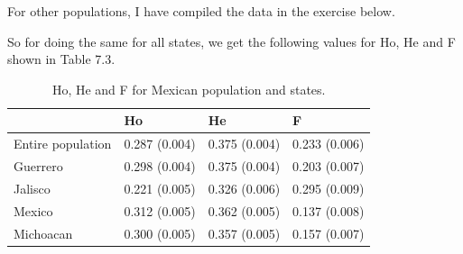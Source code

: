 \documentclass[
]{book}
\newenvironment{Shaded}{\begin{snugshade}}{\end{snugshade}}
\newcommand{\AttributeTok}[1]{\textcolor[rgb]{0.77,0.63,0.00}{#1}}
\newcommand{\ConstantTok}[1]{\textcolor[rgb]{0.00,0.00,0.00}{#1}}
\newcommand{\DecValTok}[1]{\textcolor[rgb]{0.00,0.00,0.81}{#1}}
\newcommand{\FunctionTok}[1]{\textcolor[rgb]{0.00,0.00,0.00}{#1}}
\newcommand{\NormalTok}[1]{#1}
\newcommand{\OtherTok}[1]{\textcolor[rgb]{0.56,0.35,0.01}{#1}}
\newcommand{\SpecialCharTok}[1]{\textcolor[rgb]{0.00,0.00,0.00}{#1}}
\newcommand{\StringTok}[1]{\textcolor[rgb]{0.31,0.60,0.02}{#1}}
\begin{document}
\begin{Shaded}
\end{Shaded}

For other populations, I have compiled the data in the exercise below.

So for doing the same for all states, we get the following values for Ho, He and F shown in Table 7.3.

\begin{table}

\caption{\label{tab:unnamed-chunk-285}Ho, He and F for Mexican population and states.}
\centering
\begin{tabular}[t]{llll}
\toprule
  & Ho & He & F\\
\midrule
Entire population & 0.287 (0.004) & 0.375 (0.004) & 0.233 (0.006)\\
Guerrero & 0.298 (0.004) & 0.375 (0.004) & 0.203 (0.007)\\
Jalisco & 0.221 (0.005) & 0.326 (0.006) & 0.295 (0.009)\\
Mexico & 0.312 (0.005) & 0.362 (0.005) & 0.137 (0.008)\\
Michoacan & 0.300 (0.005) & 0.357 (0.005) & 0.157 (0.007)\\
\bottomrule
\end{tabular}
\end{table}
\end{document}
